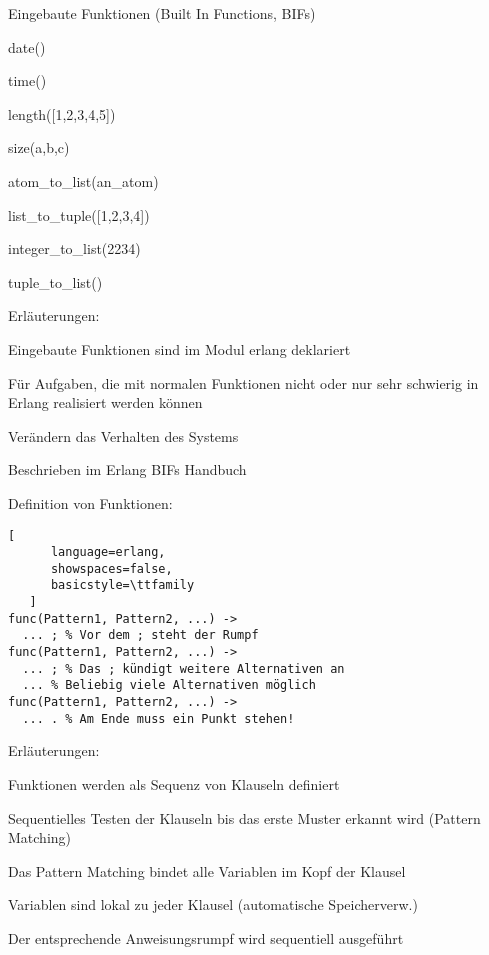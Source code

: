 \documentclass[10pt]{article}
\begin{document}
\begin{itemize*}
Eingebaute Funktionen (Built In Functions, BIFs)
\begin{itemize*}
  \item date()
  \item time()
  \item length([1,2,3,4,5])
  \item size({a,b,c})
  \item atom\_to\_list(an\_atom)
  \item list\_to\_tuple([1,2,3,4])
  \item integer\_to\_list(2234)
  \item tuple\_to\_list({})
  \item Erläuterungen:
  \begin{itemize*}
    \item Eingebaute Funktionen sind im Modul erlang deklariert
    \item Für Aufgaben, die mit normalen Funktionen nicht oder nur sehr schwierig in Erlang realisiert werden können
    \item Verändern das Verhalten des Systems
    \item Beschrieben im Erlang BIFs Handbuch
  \end{itemize*}
\end{itemize*}

Definition von Funktionen:
\begin{lstlisting}[
      language=erlang,
      showspaces=false,
      basicstyle=\ttfamily
   ]
func(Pattern1, Pattern2, ...) ->
  ... ; % Vor dem ; steht der Rumpf
func(Pattern1, Pattern2, ...) ->
  ... ; % Das ; kündigt weitere Alternativen an
  ... % Beliebig viele Alternativen möglich
func(Pattern1, Pattern2, ...) ->
  ... . % Am Ende muss ein Punkt stehen!
\end{lstlisting}
Erläuterungen:
\begin{itemize*}
  \item Funktionen werden als Sequenz von Klauseln definiert
  \item Sequentielles Testen der Klauseln bis das erste Muster erkannt wird (Pattern Matching)
  \item Das Pattern Matching bindet alle Variablen im Kopf der Klausel
  \item Variablen sind lokal zu jeder Klausel (automatische Speicherverw.)
  \item Der entsprechende Anweisungsrumpf wird sequentiell ausgeführt
\end{itemize*}


\end{itemize*}
\end{document}
